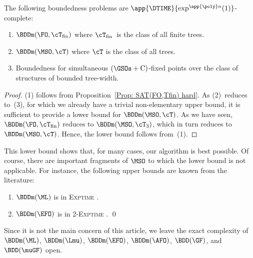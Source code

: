 \documentclass{LMCS}
\begin{document}
\begin{cor}
The following boundedness problems are $\app{\DTIME}{\exp^{\app{\poly}n}(1)}$-complete\?:
\begin{enumerate}
\item $\BDDm(\FO,\cT_{\mathrm{fin}})$ where $\cT_{\mathrm{fin}}$~is the class of all finite trees.
\item $\BDDm(\MSO,\cT)$ where $\cT$ is the class of all trees.
\item Boundedness for simultaneous $(\GSOs+\mathrm C)$-fixed points
  over the class of structures of bounded tree-width.
\end{enumerate}
\end{cor}
\begin{proof}
(1) follows from Proposition~\ref{Prop: SAT(FO,Tfin) hard}.
As (2)~reduces to~(3), for which we already have a trivial non-elementary upper
bound, it is sufficient to provide a lower bound for $\BDDm(\MSO,\cT)$.
As we have seen, $\BDDm(\FO,\cT_{\mathrm{fin}})$ reduces to
$\BDDm(\MSO,\cT_3)$, which in turn reduces to $\BDDm(\MSO,\cT)$.
Hence, the lower bound follows from~(1).
\end{proof}

This lower bound shows that, for many cases, our algorithm is best possible.
Of course, there are important fragments of $\MSO$ to which the lower bound is not applicable.
For instance, the following upper bounds are known from the literature\?:
\begin{thm}\leavevmode
\begin{enumerate}
\item $\BDDm(\ML)$ is in \textsc{Exptime} \textup{\cite{Otto99}.}
\item $\BDDm(\EFO)$ is in \textsc{2-Exptime} \textup{\cite{CosmadakisGaKaVa88}.}
\qed\end{enumerate}
\end{thm}
Since it is not the main concern of this article, we leave the exact
complexity of $\BDDm(\ML)$, $\BDDm(\Lmu)$, $\BDDm(\EFO)$, $\BDDm(\AFO)$, $\BDD(\GF)$, and $\BDD(\muGF)$ open.




\end{document}
